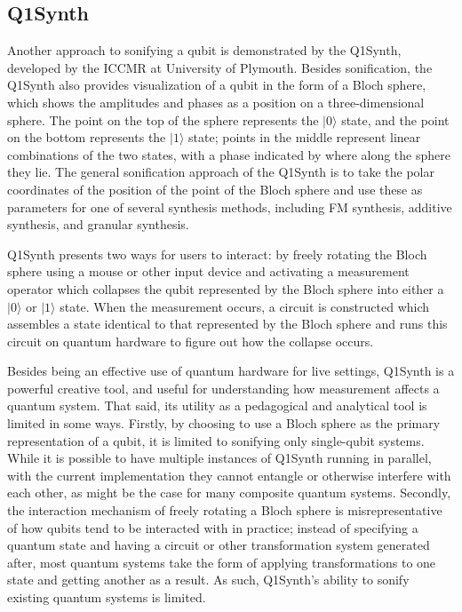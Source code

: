 \documentclass[10pt,twocolumn]{article}
\begin{document}
\subsection{Q1Synth}

Another approach to sonifying a qubit is demonstrated by the Q1Synth\cite{q1synth}, developed by the ICCMR at University of Plymouth. Besides sonification, the Q1Synth also provides visualization of a qubit in the form of a Bloch sphere, which shows the amplitudes and phases as a position on a three-dimensional sphere. The point on the top of the sphere represents the $|0\rangle$ state, and the point on the bottom represents the $|1\rangle$ state; points in the middle represent linear combinations of the two states, with a phase indicated by where along the sphere they lie. The general sonification approach of the Q1Synth is to take the polar coordinates of the position of the point of the Bloch sphere and use these as parameters for one of several synthesis methods, including FM synthesis, additive synthesis, and granular synthesis.

Q1Synth presents two ways for users to interact: by freely rotating the Bloch sphere using a mouse or other input device and activating a measurement operator which collapses the qubit represented by the Bloch sphere into either a $|0\rangle$ or $|1\rangle$ state. When the measurement occurs, a circuit is constructed which assembles a state identical to that represented by the Bloch sphere and runs this circuit on quantum hardware to figure out how the collapse occurs.

Besides being an effective use of quantum hardware for live settings, Q1Synth is a powerful creative tool, and useful for understanding how measurement affects a quantum system. That said, its utility as a pedagogical and analytical tool is limited in some ways. Firstly, by choosing to use a Bloch sphere as the primary representation of a qubit, it is limited to sonifying only single-qubit systems. While it is possible to have multiple instances of Q1Synth running in parallel, with the current implementation they cannot entangle or otherwise interfere with each other, as might be the case for many composite quantum systems. Secondly, the interaction mechanism of freely rotating a Bloch sphere is misrepresentative of how qubits tend to be interacted with in practice; instead of specifying a quantum state and having a circuit or other transformation system generated after, most quantum systems take the form of applying transformations to one state and getting another as a result\cite{qmdistilled}. As such, Q1Synth’s ability to sonify existing quantum systems is limited.
\end{document}
